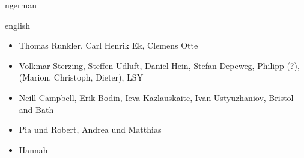 \begin{titlepage}
    
\end{titlepage}

\begin{titlepage}
    
\end{titlepage}

\begin{Abstract}{ngerman}
\end{Abstract}

\begin{Abstract}{english}
\end{Abstract}

\begin{Acknowledgements}

    \begin{itemize}
        \item Thomas Runkler, Carl Henrik Ek, Clemens Otte
        \item Volkmar Sterzing, Steffen Udluft, Daniel Hein, Stefan Depeweg, Philipp (?), (Marion, Christoph, Dieter), LSY
        \item Neill Campbell, Erik Bodin, Ieva Kazlauskaite, Ivan Ustyuzhaniov, Bristol and Bath
        \item Pia und Robert, Andrea und Matthias
        \item Hannah
    \end{itemize}
\end{Acknowledgements}

\listoftodos
\todototoc

\tableofcontents
